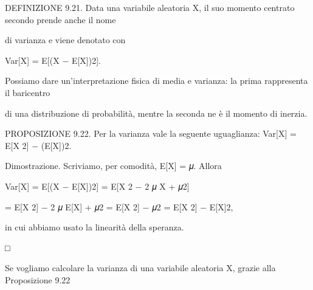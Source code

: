 \documentclass[a4paper,portrait,12pt]{article}
\begin{document}
\begin{flushleft}
DEFINIZIONE 9.21. Data una variabile aleatoria X, il suo momento centrato secondo prende anche il nome
\end{flushleft}


\begin{flushleft}
di varianza e viene denotato con
\end{flushleft}


\begin{flushleft}
Var[X] = E[(X $-$ E[X])2].
\end{flushleft}


\begin{flushleft}
Possiamo dare un'interpretazione fisica di media e varianza: la prima rappresenta il baricentro
\end{flushleft}


\begin{flushleft}
di una distribuzione di probabilit\`{a}, mentre la seconda ne \`{e} il momento di inerzia.
\end{flushleft}


\begin{flushleft}
PROPOSIZIONE 9.22. Per la varianza vale la seguente uguaglianza: Var[X] = E[X 2] $-$ (E[X])2.
\end{flushleft}


\begin{flushleft}
Dimostrazione. Scriviamo, per comodit\`{a}, E[X] = 𝜇. Allora
\end{flushleft}


\begin{flushleft}
Var[X] = E[(X $-$ E[X])2] = E[X 2 $-$ 2 𝜇 X + 𝜇2]
\end{flushleft}


\begin{flushleft}
= E[X 2] $-$ 2 𝜇 E[X] + 𝜇2 = E[X 2] $-$ 𝜇2 = E[X 2] $-$ E[X]2,
\end{flushleft}


\begin{flushleft}
in cui abbiamo usato la linearit\`{a} della speranza.
\end{flushleft}





□





\begin{flushleft}
Se vogliamo calcolare la varianza di una variabile aleatoria X, grazie alla Proposizione 9.22
\end{flushleft}
\end{document}
